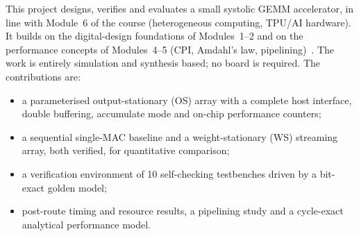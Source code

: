 This project designs, verifies and evaluates a small systolic GEMM
accelerator, in line with Module~6 of the course (heterogeneous computing,
TPU/AI hardware). It builds on the digital-design foundations of
Modules~1--2 and on the performance concepts of Modules~4--5 (CPI, Amdahl's
law, pipelining)~\cite{patterson_cod,harris_ddca}. The work is entirely
simulation and synthesis based; no board is required. The contributions are:
\begin{itemize}
\item a parameterised output-stationary (OS) array with a complete host
interface, double buffering, accumulate mode and on-chip performance counters;
\item a sequential single-MAC baseline and a weight-stationary (WS) streaming
array, both verified, for quantitative comparison;
\item a verification environment of 10 self-checking testbenches driven by a
bit-exact golden model;
\item post-route timing and resource results, a pipelining study and a
cycle-exact analytical performance model.
\end{itemize}
